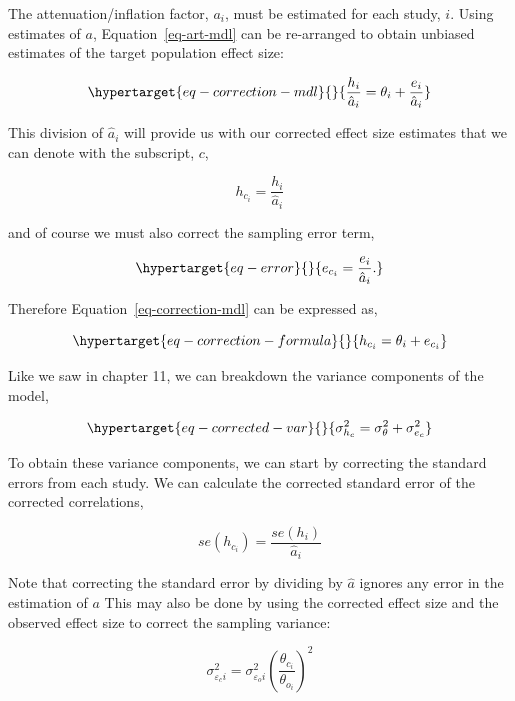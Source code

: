 \documentclass[
  letterpaper,
  DIV=11,
  numbers=noendperiod]{scrreprt}
\begin{document}
The attenuation/inflation factor, \(a_i\), must be estimated for each
study, \(i\). Using estimates of \(a\), Equation~\ref{eq-art-mdl} can be
re-arranged to obtain unbiased estimates of the target population effect
size:

\begin{equation}\protect\hypertarget{eq-correction-mdl}{}{
\frac{h_i}{\hat{a}_i} = \theta_i + \frac{e_i}{\hat{a}_i}
}\label{eq-correction-mdl}\end{equation}

This division of \(\hat{a}_i\) will provide us with our corrected effect
size estimates that we can denote with the subscript, \(c\),

\[
h_{c_i} = \frac{h_{i}}{\hat{a}_i}
\]

and of course we must also correct the sampling error term,

\begin{equation}\protect\hypertarget{eq-error}{}{
e_{c_i} = \frac{e_{i}}{\hat{a}_i}.
}\label{eq-error}\end{equation}

Therefore Equation~\ref{eq-correction-mdl} can be expressed as,

\begin{equation}\protect\hypertarget{eq-correction-formula}{}{
h_{c_i} = \theta_i + e_{c_i} 
}\label{eq-correction-formula}\end{equation}

Like we saw in chapter 11, we can breakdown the variance components of
the model,

\begin{equation}\protect\hypertarget{eq-corrected-var}{}{
\sigma^2_{h_c} = \sigma^2_{\theta} + \sigma^2_{e_c}
}\label{eq-corrected-var}\end{equation}

To obtain these variance components, we can start by correcting the
standard errors from each study. We can calculate the corrected standard
error of the corrected correlations,

\[
se(h_{c_i}) = \frac{se(h_{i})}{\hat{a}_i}
\]

Note that correcting the standard error by dividing by \(\hat{a}\)
ignores any error in the estimation of \(a\) This may also be done by
using the corrected effect size and the observed effect size to correct
the sampling variance:

\[
\sigma^2_{\varepsilon_ci} = \sigma^2_{\varepsilon_oi} \left(\frac{\theta_{c_i}}{\theta_{o_i}}\right)^2
\]
\end{document}
